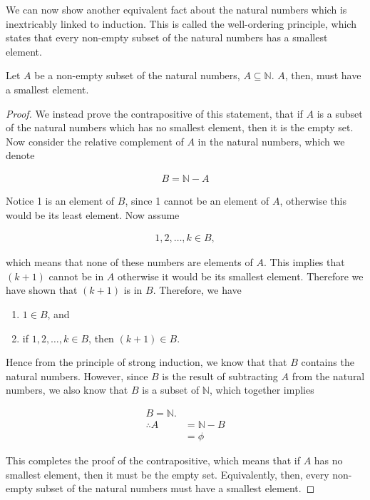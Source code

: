 \documentclass[twoside]{report}
\begin{document}
We can now show another equivalent fact about the natural numbers which is inextricably linked to induction. This is called the well-ordering principle, which states that every non-empty subset of the natural numbers has a smallest element.

\vspace{\baselineskip}
\begin{theorem}
	Let $A$ be a non-empty subset of the natural numbers, $A \subseteq \mathbb{N}$. $A$, then, must have a smallest element.
\end{theorem}
\begin{proof}
	We instead prove the contrapositive of this statement, that if $A$ is a subset of the natural numbers which has no smallest element, then it is the empty set. Now consider the relative complement of $A$ in the natural numbers, which we denote
	
	\begin{align*}
		B = \mathbb{N} - A
	\end{align*}
	
	Notice 1 is an element of $B$, since 1 cannot be an element of $A$, otherwise this would be its least element. Now assume
	
	\begin{align*}
		1, 2, \dots, k \in B,
	\end{align*}
	
	which means that none of these numbers are elements of $A$. This implies that $(k + 1)$ cannot be in $A$ otherwise it would be its smallest element. Therefore we have shown that $(k + 1)$ is in $B$. Therefore, we have
	
	\vspace{\baselineskip}
	\begin{enumerate}
		\item $1 \in B$, and
		\item if $1, 2, \dots, k \in B$, then $(k + 1) \in B$.
	\end{enumerate}
	\vspace{\baselineskip}
	
	Hence from the principle of strong induction, we know that that $B$ contains the natural numbers. However, since $B$ is the result of subtracting $A$ from the natural numbers, we also know that $B$ is a subset of $\mathbb{N}$, which together implies
	
	\begin{align*}
		B = \mathbb{N}. \\
		\therefore A &= \mathbb{N} - B \\
		&= \phi
	\end{align*}
	
	This completes the proof of the contrapositive, which means that if $A$ has no smallest element, then it must be the empty set. Equivalently, then, every non-empty subset of the natural numbers must have a smallest element. 
\end{proof}
\vspace{\baselineskip}
\end{document}
